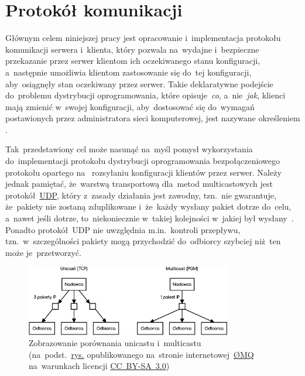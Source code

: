 \documentclass[thesis]{subfiles}
\begin{document}
\chapter{Protokół komunikacji}

Głównym celem niniejszej pracy jest opracowanie i~implementacja protokołu komunikacji serwera i~klienta, który pozwala na~wydajne i~bezpieczne przekazanie przez serwer klientom ich oczekiwanego stanu konfiguracji, a~następnie umożliwia klientom zastosowanie się do~tej konfiguracji, aby~osiągnęły stan oczekiwany przez serwer. Takie deklaratywne podejście do~problemu dystrybucji oprogramowania, które opisuje~\emph{co}, a~nie~\emph{jak}, klienci mają zmienić w~swojej konfiguracji, aby~dostosować się do~wymagań postawionych przez administratora sieci komputerowej, jest nazywane określeniem .

Tak~przedstawiony cel może nasunąć na~myśl pomysł wykorzystania do~implementacji protokołu dystrybucji oprogramowania bezpołączeniowego protokołu opartego na~ rozsyłaniu konfiguracji klientów przez serwer. Należy jednak pamiętać, że~warstwą transportową dla~metod multicastowych jest protokół~\href{https://en.wikipedia.org/wiki/User_Datagram_Protocol}{UDP}, który z~zasady działania jest zawodny, tzn.~nie gwarantuje, że~pakiety nie zostaną zduplikowane i~że~każdy wysłany pakiet dotrze do~celu, a~nawet jeśli dotrze, to~niekoniecznie w~takiej kolejności w~jakiej był wysłany~\cite{rfc1112}. Ponadto protokół~UDP nie uwzględnia m.in.~kontroli przepływu, tzn.~w~szczególności pakiety mogą przychodzić do~odbiorcy szybciej niż~ten może je~przetworzyć.

\begin{figure}
	\centering
	\includegraphics[width=0.8\textwidth]{img/unicast-vs-multicast}
	\caption{Zobrazowanie porównania unicastu i~multicastu\\(na~podst.~\href{http://zeromq.wdfiles.com/local--files/whitepapers\%3Adesign-v05/pgm2.png}{rys.} opublikowanego na~stronie internetowej~\href{http://zeromq.org/}{ØMQ} na~warunkach licencji  \href{https://creativecommons.org/licenses/by-sa/3.0/}{CC~BY-SA~3.0})}
	\label{fig:unicast-vs-multicast}
\end{figure}
\end{document}
